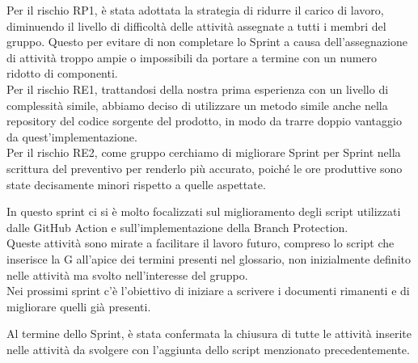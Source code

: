 Per il rischio RP1, è stata adottata la strategia di ridurre il carico di lavoro, diminuendo il livello di difficoltà delle attività assegnate a tutti i membri del gruppo. Questo per evitare di non completare lo Sprint a causa dell'assegnazione di attività troppo ampie o impossibili da portare a termine con un numero ridotto di componenti.\\
Per il rischio RE1, trattandosi della nostra prima esperienza con un livello di complessità simile, abbiamo deciso di utilizzare un metodo simile anche nella repository del codice sorgente del prodotto, in modo da trarre doppio vantaggio da quest'implementazione.\\
Per il rischio RE2, come gruppo cerchiamo di migliorare Sprint per Sprint nella scrittura del preventivo per renderlo più accurato, poiché le ore produttive sono state decisamente minori rispetto a quelle aspettate.

In questo sprint ci si è molto focalizzati sul miglioramento degli script utilizzati dalle GitHub Action e sull'implementazione della Branch Protection.\\
Queste attività sono mirate a facilitare il lavoro futuro, compreso lo script che inserisce la G all'apice dei termini presenti nel glossario, non inizialmente definito nelle attività ma svolto nell'interesse del gruppo.\\
Nei prossimi sprint c'è l'obiettivo di iniziare a scrivere i documenti rimanenti e di migliorare quelli già presenti.

Al termine dello Sprint, è stata confermata la chiusura di tutte le attività inserite nelle attività da svolgere con l'aggiunta dello script menzionato precedentemente.